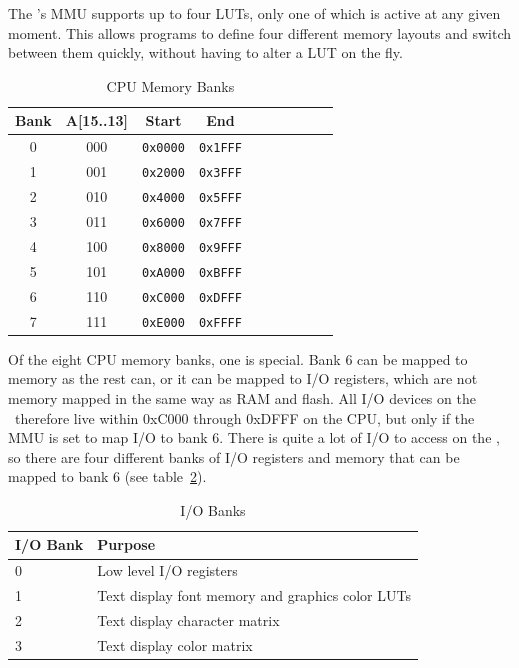 The \jr's MMU supports up to four LUTs, only one of which is active at any given moment. This allows programs to define four different memory layouts and switch between them quickly, without having to alter a LUT on the fly.

\begin{table}[h]
	\begin{center}
		\begin{tabular}{| c | c || c | c | c | c | c | c | c | c |} \hline
			Bank & A[15..13] & Start & End \\ \hline\hline
			0 & 000 & \verb+0x0000+ & \verb+0x1FFF+ \\ \hline
			1 & 001 & \verb+0x2000+ & \verb+0x3FFF+ \\ \hline
			2 & 010 & \verb+0x4000+ & \verb+0x5FFF+ \\ \hline
			3 & 011 & \verb+0x6000+ & \verb+0x7FFF+ \\ \hline
			4 & 100 & \verb+0x8000+ & \verb+0x9FFF+ \\ \hline
			5 & 101 & \verb+0xA000+ & \verb+0xBFFF+ \\ \hline
			6 & 110 & \verb+0xC000+ & \verb+0xDFFF+ \\ \hline
			7 & 111 & \verb+0xE000+ & \verb+0xFFFF+ \\ \hline
		\end{tabular}
	\end{center}
	\caption{CPU Memory Banks}
	\label{tab:mem_banks}
\end{table}

Of the eight CPU memory banks, one is special. Bank 6 can be mapped to memory as the rest can, or it can be mapped to I/O registers, which are not memory mapped in the same way as RAM and flash. All I/O devices on the \jr\ therefore live within 0xC000 through 0xDFFF on the CPU, but only if the MMU is set to map I/O to bank 6. There is quite a lot of I/O to access on the \jr, so there are four different banks of I/O registers and memory that can be mapped to bank 6 (see table~\ref{tab:io_banks}).

\begin{table}[h]
	\begin{center}
		\begin{tabular}{| l | l |} \hline
			I/O Bank & Purpose \\ \hline\hline
			0 & Low level I/O registers \\ \hline
			1 & Text display font memory and graphics color LUTs \\ \hline
			2 & Text display character matrix \\ \hline
			3 & Text display color matrix \\ \hline
		\end{tabular}
	\end{center}
	\caption{I/O Banks}
	\label{tab:io_banks}
\end{table}

